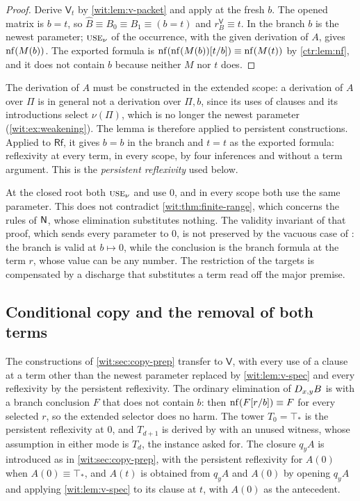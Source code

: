 \begin{proof}
Derive $\mathsf V_t$ by \cref{wit:lem:v-packet} and apply  at
the fresh $b$.  The opened matrix is $b=t$, so $\widehat B\equiv B_0\equiv
B_1\equiv(b=t)$ and $r^{\mathsf V}_B\equiv t$.  In the branch $b$ is the
newest parameter; $\rulename{Use}_\nu$ of the occurrence, with the given
derivation of $A$, gives $\operatorname{nf}(M(b))$.  The exported formula is
$\operatorname{nf}(\operatorname{nf}(M(b))[t/b])\equiv\operatorname{nf}(M(t))$ by \cref{ctr:lem:nf}, and it does
not contain $b$ because neither $M$ nor $t$ does.
\end{proof}

The derivation of $A$ must be constructed in the extended scope: a
derivation of $A$ over $\Pi$ is in general not a derivation over $\Pi,b$,
since its uses of clauses and its introductions select $\nu(\Pi)$, which is
no longer the newest parameter (\cref{wit:ex:weakening}).  The lemma is
therefore applied to persistent constructions.  Applied to $\mathsf{Rf}$, it
gives $b=b$ in the branch and $t=t$ as the exported formula: reflexivity at
every term, in every scope, by four inferences and without a term argument.
This is the \emph{persistent reflexivity} used below.

\begin{remark}
\label{wit:rem:v-obstruction}
At the closed root both $\rulename{Use}_\nu$ and  use $0$,
and in every scope both use the same parameter.  This does not contradict
\cref{wit:thm:finite-range}, which concerns the rules of $\mathsf{N}$, whose
elimination  substitutes nothing.  The validity invariant of
that proof, which sends every parameter to $0$, is not preserved by the
vacuous case of : the branch is valid at $b\mapsto 0$,
while the conclusion is the branch formula at the term $r$, whose value can
be any number.  The restriction of the targets is compensated by a discharge
that substitutes a term read off the major premise.
\end{remark}

\subsection{Conditional copy and the removal of both terms}
\label{wit:sec:vac-copy}

The constructions of \cref{wit:sec:copy-prep} transfer to $\mathsf V$, with
every use of a clause at a term other than the newest parameter replaced by
\cref{wit:lem:v-spec} and every reflexivity by the persistent reflexivity.
The ordinary elimination of $D_{x,y}B$ is  with a branch
conclusion $F$ that does not contain $b$: then $\operatorname{nf}(F[r/b])\equiv F$
for every selected $r$, so the extended selector does no harm.  The tower
$T_0=\top_{*}$ is the persistent reflexivity at $0$, and $T_{d+1}$ is
derived by  with an unused witness, whose assumption in
either mode is $T_d$, the instance asked for.  The closure $q_yA$ is
introduced as in \cref{wit:sec:copy-prep}, with the persistent reflexivity
for $A(0)$ when $A(0)\equiv\top_{*}$, and $A(t)$ is obtained from $q_yA$ and
$A(0)$ by opening $q_yA$ and applying \cref{wit:lem:v-spec} to its clause at
$t$, with $A(0)$ as the antecedent.

